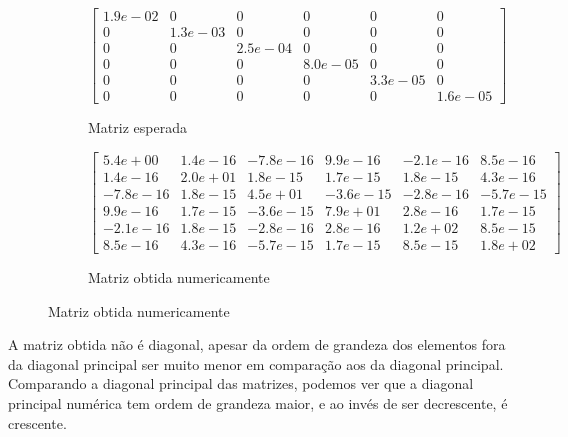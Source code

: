 \documentclass{article}
\begin{document}
\begin{figure}[h!]
    \centering
    \begin{subfigure}[b]{\textwidth}
        \centering
        \[
            \begin{bmatrix}
                1.9e-02 & 0 & 0 & 0 & 0 & 0 \\
                0 & 1.3e-03 & 0 & 0 & 0 & 0 \\
                0 & 0 & 2.5e-04 & 0 & 0 & 0 \\
                0 & 0 & 0 & 8.0e-05 & 0 & 0 \\
                0 & 0 & 0 & 0 & 3.3e-05 & 0 \\
                0 & 0 & 0 & 0 & 0 & 1.6e-05
                \end{bmatrix}
        \]
        \caption{Matriz esperada}
    \end{subfigure}
    \vfill
    \begin{subfigure}[b]{\textwidth}
        \centering
        \[
            \begin{bmatrix}
                5.4e+00 & 1.4e-16 & -7.8e-16 & 9.9e-16 & -2.1e-16 & 8.5e-16 \\
                1.4e-16 & 2.0e+01 & 1.8e-15 & 1.7e-15 & 1.8e-15 & 4.3e-16 \\
                -7.8e-16 & 1.8e-15 & 4.5e+01 & -3.6e-15 & -2.8e-16 & -5.7e-15 \\
                9.9e-16 & 1.7e-15 & -3.6e-15 & 7.9e+01 & 2.8e-16 & 1.7e-15 \\
                -2.1e-16 & 1.8e-15 & -2.8e-16 & 2.8e-16 & 1.2e+02 & 8.5e-15 \\
                8.5e-16 & 4.3e-16 & -5.7e-15 & 1.7e-15 & 8.5e-15 & 1.8e+02
            \end{bmatrix}
        \]
        \caption{Matriz obtida numericamente}
    \end{subfigure}
    \label{fig:matrizes1}
\end{figure}

A matriz obtida não é diagonal, apesar da ordem de grandeza dos elementos fora da diagonal principal ser muito menor em comparação aos da diagonal principal.
Comparando a diagonal principal das matrizes, podemos ver que a diagonal principal numérica tem ordem de grandeza maior, e ao invés de ser decrescente, é crescente.
\end{document}
